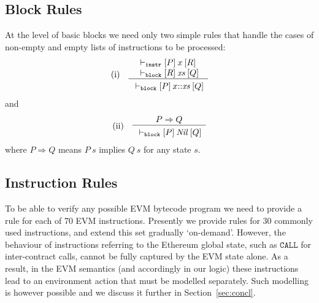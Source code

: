 \documentclass[sigplan,10pt]{acmart}\settopmatter{printfolios=true,printccs=false,printacmref=false}
\newcommand{\subpred}{\Rightarrow}
\newcommand{\ttrip}[5]{\mathit{#1} \vdash_{\mathrm{#2}}[#3]\:#4\:[#5]}
\newcommand{\instr}[1]{\mathtt{#1}}
\newcommand{\RuleC}[2]{\begin{array}{c}#1\\\hline\noalign{\smallskip}#2\end{array}}
\begin{document}
\subsection{Block Rules}
\label{sec:block-rules}
At the level of basic blocks we need only two simple rules
that handle the cases of non-empty and empty lists of instructions
to be processed:
\[
\begin{array}{l l}
\mbox{(i)} & \RuleC{\begin{array}{l}\ttrip{}{\mathtt{instr}}{P}{x}{R} \\
                    \ttrip{}{\mathtt{block}}{R}{\mathit{xs}}{Q}
                    \end{array}}
                   {\ttrip{}{\mathtt{block}}{P}{x\mbox{::}\mathit{xs}}{Q}}
\end{array}
\]
and
\[
\begin{array}{l l}
\mbox{(ii)} & \RuleC{P \subpred Q} 
{\ttrip{}{\mathtt{block}}{P}{\mathit{Nil}}{Q}}
\end{array}
\]
where $P \subpred Q$ means $P\:s$ implies $Q\:s$ for any state $s$.
%
\subsection{Instruction Rules}
\label{sec:instr-rules}
To be able to verify any possible EVM bytecode program we need to provide a rule for 
each of 70 EVM instructions.
Presently we provide rules for 30 commonly used instructions,
and extend this set gradually `on-demand'.
However, the behaviour of instructions referring to the Ethereum global state, 
such as $\instr{CALL}$ for inter-contract calls, cannot be fully captured
by the EVM state alone.
As a result, in the EVM semantics (and accordingly in our logic) these
instructions lead to an environment action that must be modelled separately.
Such modelling is however possible and we discuss it further in Section~\ref{sec:concl}.
\end{document}
